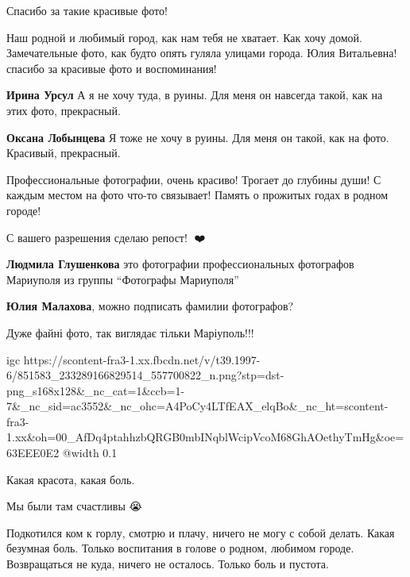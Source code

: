 
Спасибо за такие красивые фото!


Наш родной и любимый город, как нам тебя не хватает. Как хочу
домой. Замечательные фото, как будто опять гуляла улицами города. Юлия Витальевна!
спасибо за красивые фото и воспоминания!

\begin{itemize} %
\textbf{Ирина Урсул} А я не хочу туда, в руины. Для меня он навсегда такой, как на этих фото, прекрасный.

\textbf{Оксана Лобынцева} Я тоже не хочу в руины. Для меня он такой, как на фото. Красивый, прекрасный.
\end{itemize} %


Профессиональные фотографии, очень красиво! Трогает до глубины души! С каждым
местом на фото что-то связывает! Память о прожитых годах в родном городе!

С вашего разрешения сделаю репост! 🥰❤️

\begin{itemize} %
\textbf{Людмила Глушенкова} это фотографии профессиональных фотографов Мариуполя из группы \enquote{Фотографы Мариуполя}

\textbf{Юлия Малахова}, можно подписать фамилии фотографов?
\end{itemize} %


Дуже файні фото, так виглядає тільки Маріуполь!!!

\ifcmt
  igc https://scontent-fra3-1.xx.fbcdn.net/v/t39.1997-6/851583_233289166829514_557700822_n.png?stp=dst-png_s168x128&_nc_cat=1&ccb=1-7&_nc_sid=ac3552&_nc_ohc=A4PoCy4LTfEAX_elqBo&_nc_ht=scontent-fra3-1.xx&oh=00_AfDq4ptahhzbQRGB0mbINqblWcipVcoM68GhAOethyTmHg&oe=63EEE0E2
	@width 0.1
\fi


Какая красота, какая боль.


Мы были там счастливы 😭


Подкотился ком к горлу, смотрю и плачу, ничего не могу с собой делать. Какая
безумная боль. Только воспитания в голове о родном, любимом городе. Возвращаться
не куда, ничего не осталось. Только боль и пустота.

